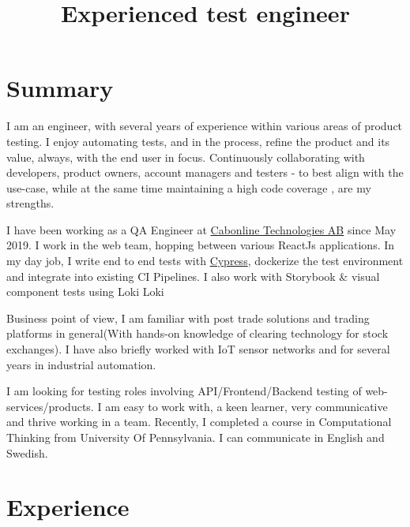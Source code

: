 \documentclass[12pt,a4paper,sans]{moderncv} %
\title{Experienced test engineer}
\begin{document}
\makecvtitle


\section{Summary}
I am an engineer, with several years of experience within various areas of product testing. I enjoy automating tests, and in the process,
refine the product and its value, always, with the end user in focus. Continuously collaborating with developers, product owners,
account managers and testers - to best align with the use-case, while at the same time maintaining a high code coverage , are my strengths.

\hfill \break
I have been working as a QA Engineer at {\href{https://www.cabonline.com/}{\color{cyan}Cabonline Technologies AB}} since May 2019. I work
in the web team, hopping between various ReactJs applications. In my day job, I write end to end tests with {\href{https://www.cypress.io/}{\color{cyan}Cypress}}, 
dockerize the test environment and integrate into existing CI Pipelines. I also work with {\color{cyan}Storybook} \& visual component tests using Loki {\color{cyan}Loki}

\hfill \break
Business point of view, I am familiar with post trade solutions and
trading platforms in general(With hands-on knowledge of clearing technology for stock exchanges). I have also briefly worked
with IoT sensor networks and for several years in industrial automation.

\hfill \break
I am looking for testing roles involving API/Frontend/Backend testing of web-services/products. I am easy to work with,
a keen learner, very communicative and thrive working in a team. Recently, I completed a course in Computational Thinking from University Of Pennsylvania.
I can communicate in English and Swedish.

\section{Experience}
\end{document}
